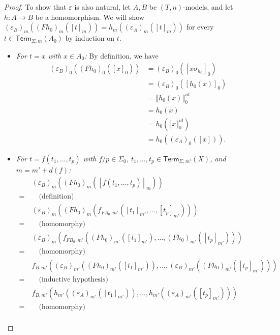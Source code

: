 \documentclass[a4paper,UKenglish,cleveref,thm-restate,numberwithinsect,final]{lipics-v2021}
\newcommand{\Term}{\mathsf{Term}}
\newcommand{\sig}{\Sigma}
\newcommand{\sigp}{\Sigma_0}
\theoremstyle{plain}
\newcommand{\id}{\mathit{id}}
\numberwithin{equation}{section}
\newcommand{\+}[1]{\mathcal{#1}\xspace}
\theoremstyle{definition}
\begin{document}
\begin{proof}
    To show that \(\varepsilon\) is also natural, let \(A, B\) be
    $(T,n)$-models, and let \(h\colon A\to B\) be a homomorphism.  We
    will show
    \((\varepsilon_B)_m((Fh_0)_m([t]_m)) =
    h_m((\varepsilon_A)_m([t]_m))\) for every
    \(t \in \Term_{\sig, m}(A_0)\) by induction on \(t\).
    \begin{itemize}
        \item
            \textit{For \(t = x\) with \(x \in A_0\):} By definition, we have
            \begin{align*}
                (\varepsilon_B)_0((Fh_0)_0([x]_0))
                &= (\varepsilon_B)_0([x\sigma_{h_0}]_0) \\
                &= (\varepsilon_B)_0([h_0(x)]_0) \\
                &= \llbracket h_0(x) \rrbracket^{\id}_0 \\
                &= h_0(x) \\
                &= h_0(\llbracket x \rrbracket^{\id}_0) \\
                &= h_0((\varepsilon_A)_0([x])).
            \end{align*}
        \item
            \textit{For \(t = f(t_1, \ldots, t_p)\) with \(f/p \in \sigp\), \(t_1, \ldots, t_p \in \Term_{\sig, m'}(X)\), and \(m = m' + d(f)\):}
            \begin{align*}
                &(\varepsilon_B)_m((Fh_0)_m([f(t_1, \ldots, t_p)]_m)) \\
                =~&\quad\text{(definition)} \\
                &(\varepsilon_B)_m((Fh_0)_m(f_{FA_0, m'}([t_1]_{m'}, \ldots, [t_p]_{m'}))) \\
                =~&\quad\text{(homomorphy)} \\
                &(\varepsilon_B)_m(f_{FB_0, m'}((Fh_0)_{m'}([t_1]_{m'}), \ldots, (Fh_0)_{m'}([t_p]_{m'}))) \\
                =~&\quad\text{(homomorphy)} \\
                &f_{B, m'}((\varepsilon_B)_{m'}((Fh_0)_{m'}([t_1]_{m'})), \ldots, (\varepsilon_B)_{m'}((Fh_0)_{m'}([t_p]_{m'}))) \\
                =~&\quad\text{(inductive hypothesis)} \\
                &f_{B, m'}(h_{m'}((\varepsilon_A)_{m'}([t_1]_{m'})), \ldots, h_{m'}((\varepsilon_A)_{m'}([t_p]_{m'}))) \\
                =~&\quad\text{(homomorphy)} \\

\end{align*}
\end{itemize}
\end{proof}
\end{document}
